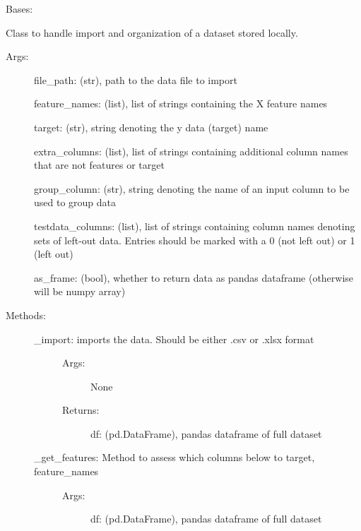 \documentclass[letterpaper,10pt,english]{sphinxmanual}
\begin{document}
\begin{fulllineitems}
\label{\detokenize{api/mastml.datasets.LocalDatasets:mastml.datasets.LocalDatasets}}
Bases: 

Class to handle import and organization of a dataset stored locally.
\begin{description}
\item[{Args:}] \leavevmode
file\_path: (str), path to the data file to import

feature\_names: (list), list of strings containing the X feature names

target: (str), string denoting the y data (target) name

extra\_columns: (list), list of strings containing additional column names that are not features or target

group\_column: (str), string denoting the name of an input column to be used to group data

testdata\_columns: (list), list of strings containing column names denoting sets of left-out data. Entries should be marked with a 0 (not left out) or 1 (left out)

as\_frame: (bool), whether to return data as pandas dataframe (otherwise will be numpy array)

\item[{Methods:}] \leavevmode\begin{description}
\item[{\_import: imports the data. Should be either .csv or .xlsx format}] \leavevmode\begin{description}
\item[{Args:}] \leavevmode
None

\item[{Returns:}] \leavevmode
df: (pd.DataFrame), pandas dataframe of full dataset

\end{description}

\item[{\_get\_features: Method to assess which columns below to target, feature\_names}] \leavevmode\begin{description}
\item[{Args:}] \leavevmode
df: (pd.DataFrame), pandas dataframe of full dataset


\end{description}
\end{description}
\end{description}
\end{fulllineitems}
\end{document}

